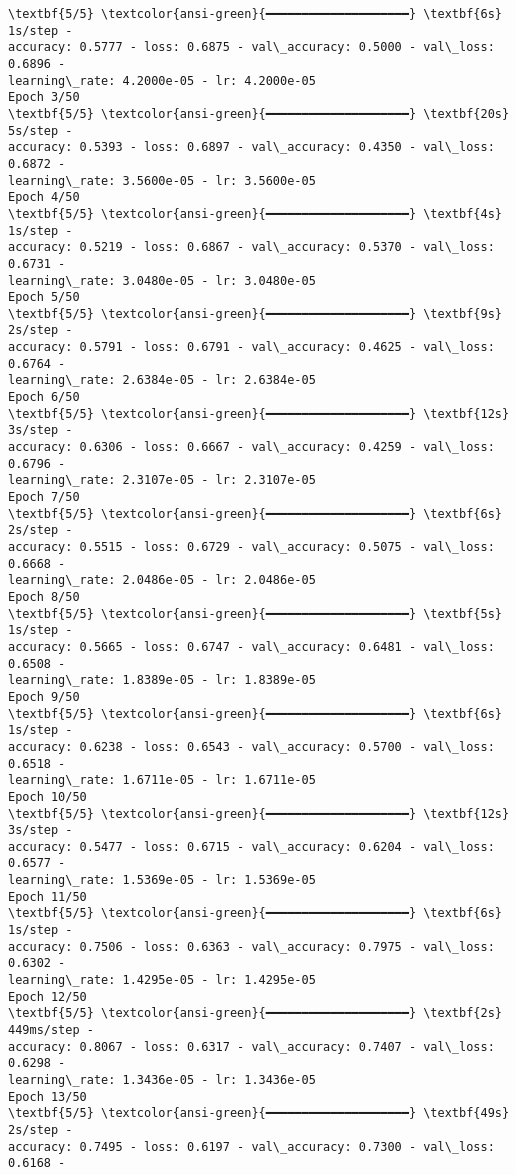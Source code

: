 \documentclass[11pt]{article}
\begin{document}
    \begin{Verbatim}[commandchars=\\\{\}]
\textbf{5/5} \textcolor{ansi-green}{━━━━━━━━━━━━━━━━━━━━} \textbf{6s} 1s/step -
accuracy: 0.5777 - loss: 0.6875 - val\_accuracy: 0.5000 - val\_loss: 0.6896 -
learning\_rate: 4.2000e-05 - lr: 4.2000e-05
Epoch 3/50
\textbf{5/5} \textcolor{ansi-green}{━━━━━━━━━━━━━━━━━━━━} \textbf{20s} 5s/step -
accuracy: 0.5393 - loss: 0.6897 - val\_accuracy: 0.4350 - val\_loss: 0.6872 -
learning\_rate: 3.5600e-05 - lr: 3.5600e-05
Epoch 4/50
\textbf{5/5} \textcolor{ansi-green}{━━━━━━━━━━━━━━━━━━━━} \textbf{4s} 1s/step -
accuracy: 0.5219 - loss: 0.6867 - val\_accuracy: 0.5370 - val\_loss: 0.6731 -
learning\_rate: 3.0480e-05 - lr: 3.0480e-05
Epoch 5/50
\textbf{5/5} \textcolor{ansi-green}{━━━━━━━━━━━━━━━━━━━━} \textbf{9s} 2s/step -
accuracy: 0.5791 - loss: 0.6791 - val\_accuracy: 0.4625 - val\_loss: 0.6764 -
learning\_rate: 2.6384e-05 - lr: 2.6384e-05
Epoch 6/50
\textbf{5/5} \textcolor{ansi-green}{━━━━━━━━━━━━━━━━━━━━} \textbf{12s} 3s/step -
accuracy: 0.6306 - loss: 0.6667 - val\_accuracy: 0.4259 - val\_loss: 0.6796 -
learning\_rate: 2.3107e-05 - lr: 2.3107e-05
Epoch 7/50
\textbf{5/5} \textcolor{ansi-green}{━━━━━━━━━━━━━━━━━━━━} \textbf{6s} 2s/step -
accuracy: 0.5515 - loss: 0.6729 - val\_accuracy: 0.5075 - val\_loss: 0.6668 -
learning\_rate: 2.0486e-05 - lr: 2.0486e-05
Epoch 8/50
\textbf{5/5} \textcolor{ansi-green}{━━━━━━━━━━━━━━━━━━━━} \textbf{5s} 1s/step -
accuracy: 0.5665 - loss: 0.6747 - val\_accuracy: 0.6481 - val\_loss: 0.6508 -
learning\_rate: 1.8389e-05 - lr: 1.8389e-05
Epoch 9/50
\textbf{5/5} \textcolor{ansi-green}{━━━━━━━━━━━━━━━━━━━━} \textbf{6s} 1s/step -
accuracy: 0.6238 - loss: 0.6543 - val\_accuracy: 0.5700 - val\_loss: 0.6518 -
learning\_rate: 1.6711e-05 - lr: 1.6711e-05
Epoch 10/50
\textbf{5/5} \textcolor{ansi-green}{━━━━━━━━━━━━━━━━━━━━} \textbf{12s} 3s/step -
accuracy: 0.5477 - loss: 0.6715 - val\_accuracy: 0.6204 - val\_loss: 0.6577 -
learning\_rate: 1.5369e-05 - lr: 1.5369e-05
Epoch 11/50
\textbf{5/5} \textcolor{ansi-green}{━━━━━━━━━━━━━━━━━━━━} \textbf{6s} 1s/step -
accuracy: 0.7506 - loss: 0.6363 - val\_accuracy: 0.7975 - val\_loss: 0.6302 -
learning\_rate: 1.4295e-05 - lr: 1.4295e-05
Epoch 12/50
\textbf{5/5} \textcolor{ansi-green}{━━━━━━━━━━━━━━━━━━━━} \textbf{2s} 449ms/step -
accuracy: 0.8067 - loss: 0.6317 - val\_accuracy: 0.7407 - val\_loss: 0.6298 -
learning\_rate: 1.3436e-05 - lr: 1.3436e-05
Epoch 13/50
\textbf{5/5} \textcolor{ansi-green}{━━━━━━━━━━━━━━━━━━━━} \textbf{49s} 2s/step -
accuracy: 0.7495 - loss: 0.6197 - val\_accuracy: 0.7300 - val\_loss: 0.6168 -

\end{Verbatim}
\end{document}
